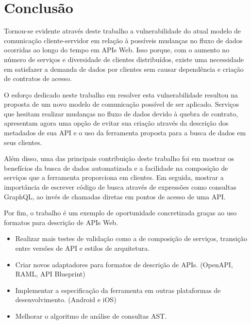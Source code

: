 \chapter{Conclusão}

Tornou-se evidente através deste trabalho a vulnerabilidade do atual modelo de comunicação cliente-servidor em relação à possíveis mudanças no fluxo de dados ocorridas ao longo do tempo em APIs Web. Isso porque, com o aumento no número de serviços e diversidade de clientes distribuídos, existe uma necessidade em satisfazer a demanda de dados por clientes sem causar dependência e criação de contratos de acesso.

O esforço dedicado neste trabalho em resolver esta vulnerabilidade resultou na proposta de um novo modelo de comunicação possível de ser aplicado. Serviços que hesitam realizar mudanças no fluxo de dados devido à quebra de contrato, apresentam agora uma opção de evitar sua criação através da descrição dos metadados de sua API e o uso da ferramenta proposta para a busca de dados em seus clientes.

Além disso, uma das principais contribuição deste trabalho foi em mostrar os benefícios da busca de dados automatizada e a facilidade na composição de serviços que a ferramenta proporciona em clientes. Em seguida, mostrar a importância de escrever código de busca através de expressões como consultas GraphQL, ao invés de chamadas diretas em pontos de acesso de uma API. 

Por fim, o trabalho é um exemplo de oportunidade concretizada graças ao uso formatos para descrição de APIs Web.



\begin{itemize}
\item Realizar mais testes de validação como a de composição de serviços, transição entre versões de API e estilos de arquitetura.
\item Criar novos adaptadores para formatos de descrição de APIs. (OpenAPI, RAML, API Blueprint)
\item Implementar a especificação da ferramenta em outras plataformas de desenvolvimento. (Android e iOS)
\item Melhorar o algoritmo de análise de consultas AST.
\end{itemize}
